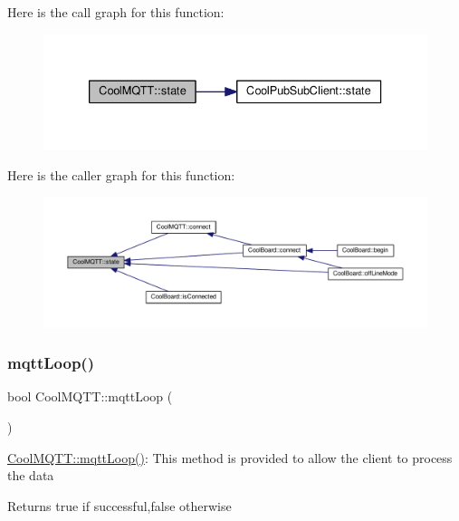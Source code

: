 Here is the call graph for this function\+:
\nopagebreak
\begin{figure}[H]
\begin{center}
\leavevmode
\includegraphics[width=333pt]{d0/dd0/class_cool_m_q_t_t_a5d003307eff78efbd585e42b43b72b6d_cgraph}
\end{center}
\end{figure}
Here is the caller graph for this function\+:
\nopagebreak
\begin{figure}[H]
\begin{center}
\leavevmode
\includegraphics[width=350pt]{d0/dd0/class_cool_m_q_t_t_a5d003307eff78efbd585e42b43b72b6d_icgraph}
\end{center}
\end{figure}
\mbox{\label{class_cool_m_q_t_t_aa5eaae967b562b62cbcf2b8d81f6e5d5}} 
\subsubsection{\texorpdfstring{mqtt\+Loop()}{mqttLoop()}}
{\footnotesize\ttfamily bool Cool\+M\+Q\+T\+T\+::mqtt\+Loop (\begin{DoxyParamCaption}{ }\end{DoxyParamCaption})}

\hyperlink{class_cool_m_q_t_t_aa5eaae967b562b62cbcf2b8d81f6e5d5}{Cool\+M\+Q\+T\+T\+::mqtt\+Loop()}\+: This method is provided to allow the client to process the data

\begin{DoxyReturn}{Returns}
true if successful,false otherwise 
\end{DoxyReturn}



